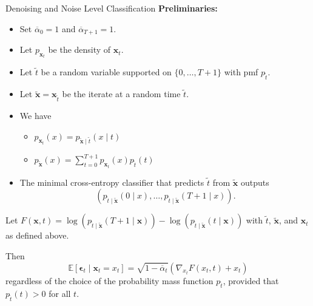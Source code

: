 \documentclass{beamer}
\def\E{\mathbb{E}}
\begin{document}
\begin{frame}[allowframebreaks]{Denoising and Noise Level Classification}
    \textbf{Preliminaries:}

    \medskip

    \begin{itemize}
        \item Set $\overline{\alpha}_0 = 1$ and $\overline{\alpha}_{T + 1} = 1$.
        \item Let $p_{\mathbf{x}_t}$ be the density of $\mathbf{x}_t$.
        \item Let $\tilde{t}$ be a random variable supported on $\{0, \ldots, T + 1\}$ with pmf $p_{\tilde{t}}$.
        \item Let $\mathbf{\tilde{x}} = \mathbf{x}_{\tilde{t}}$ be the iterate at a random time $\tilde{t}$.
        \item We have
        \begin{itemize}
            \item $p_{\mathbf{x}_t}(x) = p_{\mathbf{\tilde{x}} \mid \tilde{t}}(x \mid t)$
            \item $p_{\mathbf{\tilde{x}}}(x) = \sum_{t = 0}^{T + 1} p_{\mathbf{x}_t}(x) p_{\tilde{t}}(t)$
        \end{itemize}
        \item The minimal cross-entropy classifier that predicts $\tilde{t}$ from $\mathbf{\tilde{x}}$ outputs
        \[
        (p_{\tilde{t} \mid \mathbf{\tilde{x}}}(0 \mid x), \ldots, p_{\tilde{t} \mid \mathbf{\tilde{x}}}(T + 1 \mid x)).
        \]
    \end{itemize}    

    \framebreak

    \begin{theorem}\label{thm:denoise_classify}
        Let $F(\mathbf{x}, t) = \log(p_{\tilde{t} \mid \mathbf{\tilde{x}}}(T + 1 \mid \mathbf{x})) - \log(p_{\tilde{t} \mid \mathbf{\tilde{x}}}(t \mid \mathbf{x}))$ with $\tilde{t}$, $\mathbf{\tilde{x}}$, and $\mathbf{x}_t$ as defined above.
        
        Then
        \[
        \E[\mathbf{\epsilon}_t \mid \mathbf{x}_t = x_t] = \sqrt{1 - \overline{\alpha}_t}(\nabla_{x_t}F(x_t, t) + x_t)
        \]
        regardless of the choice of the probability mass function $p_{\tilde{t}}$, provided that $p_{\tilde{t}}(t) > 0$ for all $t$.        
    \end{theorem}
\end{frame}
\end{document}
